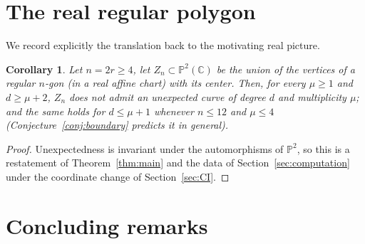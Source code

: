 \documentclass[11pt]{amsart}
\theoremstyle{plain}
\newtheorem{corollary}[theorem]{Corollary}
\theoremstyle{definition}
\newcommand{\PP}{\mathbb{P}}
\newcommand{\CC}{\mathbb{C}}
\begin{document}
\section{The real regular polygon}

We record explicitly the translation back to the motivating real picture.

\begin{corollary}
Let $n=2r\ge4$, let $Z_n\subset\PP^2(\CC)$ be the union of the vertices of a regular $n$-gon (in a real affine chart) with its center. Then, for every $\mu\ge1$ and $d\ge\mu+2$, $Z_n$ does not admit an unexpected curve of degree $d$ and multiplicity $\mu$; and the same holds for $d\le \mu+1$ whenever $n\le12$ and $\mu\le4$ (Conjecture~\ref{conj:boundary} predicts it in general).
\end{corollary}

\begin{proof}
Unexpectedness is invariant under the automorphisms of $\PP^2$, so this is a restatement of Theorem~\ref{thm:main} and the data of Section~\ref{sec:computation} under the coordinate change of Section~\ref{sec:CI}.
\end{proof}

\section{Concluding remarks}
\end{document}
